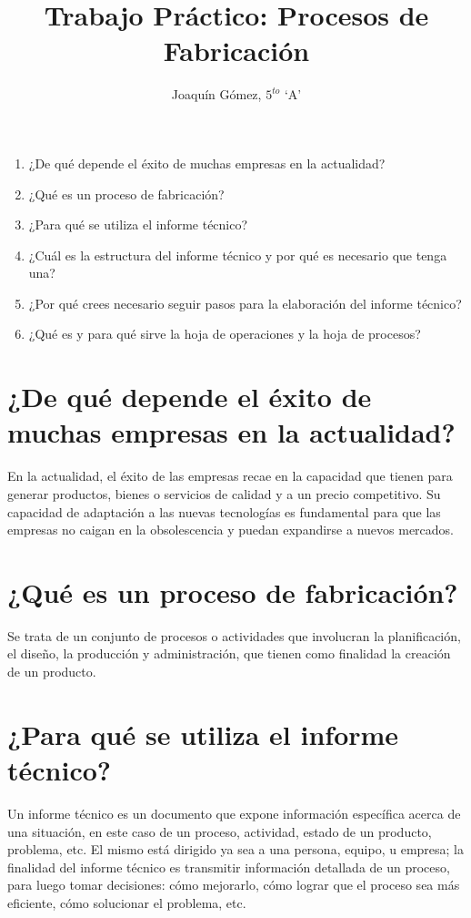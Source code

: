 \documentclass{article}
\title{Trabajo Práctico: Procesos de Fabricación}
\author{Joaquín Gómez, $5^{to}$ `A'}
\begin{document}
\maketitle
\begin{enumerate}
    \item ¿De qué depende el éxito de muchas empresas en la actualidad?
    \item ¿Qué es un proceso de fabricación?
    \item ¿Para qué se utiliza el informe técnico?
    \item ¿Cuál es la estructura del informe técnico y por qué es necesario que tenga una?
    \item ¿Por qué crees necesario seguir pasos para la elaboración del informe técnico?
    \item ¿Qué es y para qué sirve la hoja de operaciones y la hoja de procesos?
\end{enumerate}

\pagebreak

\section{¿De qué depende el éxito de muchas empresas en la actualidad?}
En la actualidad, el éxito de las empresas recae en la capacidad que tienen
para generar productos, bienes o servicios de calidad y a un precio
competitivo. Su capacidad de adaptación a las nuevas tecnologías es fundamental
para que las empresas no caigan en la obsolescencia y puedan expandirse a
nuevos mercados.

\section{¿Qué es un proceso de fabricación?}
Se trata de un conjunto de procesos o actividades que involucran la
planificación, el diseño, la producción y administración, que tienen como
finalidad la creación de un producto.

\section{¿Para qué se utiliza el informe técnico?}
Un informe técnico es un documento que expone información específica acerca de
una situación, en este caso de un proceso, actividad, estado de un producto,
problema, etc. El mismo está dirigido ya sea a una persona, equipo, u empresa;
la finalidad del informe técnico es transmitir información detallada de un
proceso, para luego tomar decisiones: cómo mejorarlo, cómo lograr que el
proceso sea más eficiente, cómo solucionar el problema, etc.
\end{document}

